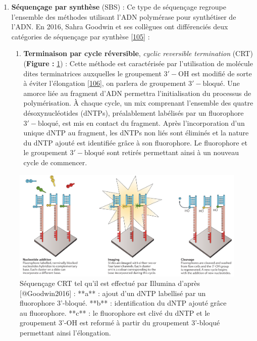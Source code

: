 \documentclass[12pt,twoside]{ugathesis}
\providecommand{\tightlist}{%
  \setlength{\itemsep}{0pt}\setlength{\parskip}{0pt}}
\theoremstyle{definition}
\theoremstyle{definition}
\theoremstyle{remark}
\begin{document}
\begin{enumerate}
\def\labelenumi{\arabic{enumi}.}
\tightlist
\item
  \textbf{Séquençage par synthèse} (SBS) : Ce type de séquençage
  regroupe l'ensemble des méthodes utilisant l'ADN polymérase pour
  synthétiser de l'ADN. En 2016, Sahra Goodwin et ses collègues ont
  différenciés deux catégories de séquençage par synthèse
  {[}\protect\hyperlink{ref-Goodwin2016}{105}{]} :

  \begin{enumerate}
  \def\labelenumii{\alph{enumii}.}
  \tightlist
  \item
    \textbf{Terminaison par cycle réversible}, \emph{cyclic reversible
    termination} (CRT) (\textbf{Figure : }\ref{fig:crtSeq}) : Cette
    méthode est caractérisée par l'utilisation de molécule dites
    terminatrices auxquelles le groupement \(\mathrm{3'-OH}\) est
    modifié de sorte à éviter l'élongation
    {[}\protect\hyperlink{ref-Guo2008}{106}{]}, on parlera de groupement
    \(\mathrm{3'-bloqué}\). Une amorce liée au fragment d'ADN permettra
    l'initialisation du processus de polymérisation. À chaque cycle, un
    mix comprenant l'ensemble des quatre désoxynucléotides (dNTPs),
    préalablement labélisés par un fluorophore \(\mathrm{3'-bloqué}\),
    est mis en contact du fragment. Après l'incorporation d'un unique
    dNTP au fragment, les dNTPs non liés sont éliminés et la nature du
    dNTP ajouté est identifiée grâce à son fluorophore. Le fluorophore
    et le groupement \(\mathrm{3'-bloqué}\) sont retirés permettant
    ainsi à un nouveau cycle de commencer.
  \end{enumerate}
\end{enumerate}

\begin{figure}

{\centering \includegraphics[scale=.24]{figure/CRT_seq_illumina} 

}

\caption[Séquençage CRT tel qu'il est effectué par Illumina]{Séquençage CRT tel qu'il est effectué par Illumina d'après [@Goodwin2016] : **a** : ajout d'un dNTP labellisé par un fluorophore 3'-bloqué. **b** : identification du dNTP ajouté grâce au fluorophore. **c** : le fluorophore est clivé du dNTP et le groupement 3'-OH est reformé à partir du groupement 3'-bloqué permettant ainsi l'élongation.}\label{fig:crtSeq}
\end{figure}
\end{document}
